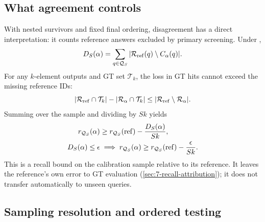 \subsection{What agreement controls}

With nested survivors and fixed final ordering, disagreement has a
direct interpretation: it counts reference answers excluded by primary
screening. Under ,
\begin{equation}
 D_S(\alpha)=\sum_{q\in\mathcal Q_S}
       |\mathcal R_{\rm ref}(q)\setminus C_\alpha(q)|.
 \label{eq:6-reference-coverage}
\end{equation}
For any $k$-element outputs and GT set $\mathcal T_k$, the loss in GT
hits cannot exceed the missing reference IDs:
\[
 |\mathcal R_{\rm ref}\cap\mathcal T_k|-|\mathcal R_\alpha\cap\mathcal T_k|
 \leq|\mathcal R_{\rm ref}\setminus\mathcal R_\alpha|.
\]
Summing over the sample and dividing by $Sk$ yields
\begin{equation}
 \begin{aligned}
 r_{\mathcal Q_S}(\alpha)
 &\geq r_{\mathcal Q_S}({\rm ref})-\frac{D_S(\alpha)}{Sk},\\
 D_S(\alpha)\leq\epsilon
 &\implies r_{\mathcal Q_S}(\alpha)
       \geq r_{\mathcal Q_S}({\rm ref})-\frac{\epsilon}{Sk}.
 \end{aligned}
 \label{eq:6-relative-recall}
\end{equation}
This is a recall bound on the calibration sample relative to its
reference. It leaves the reference's own error to GT evaluation
(\cref{sec:7-recall-attribution}); it does not transfer automatically
to unseen queries.

\subsection{Sampling resolution and ordered testing}

